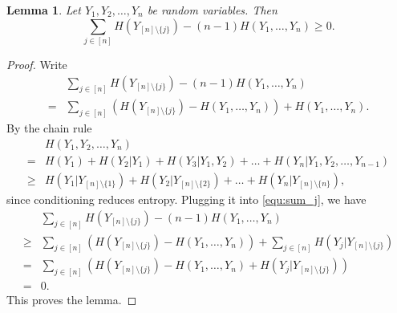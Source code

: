 \documentclass[11pt]{article}
\newtheorem{lemma}{Lemma}
\newcommand{\cond}{|}
\begin{document}
\begin{lemma}
\label{lem:sum_nm1_nonnegative}
Let $Y_1, Y_2, \ldots, Y_n$ be random variables. Then
\[
\sum_{j \in [n]} H(Y_{[n] \setminus \{j\}}) - (n-1) H(Y_1, \ldots, Y_n) \ge 0. 
\]
\end{lemma}
\begin{proof} Write
\begin{align}
 & \sum_{j \in [n]} H(Y_{[n] \setminus \{j\}}) - (n-1) H(Y_1, \ldots, Y_n) \nonumber\\
 = & \sum_{j \in [n]} \left(H(Y_{[n] \setminus \{j\}}) - H(Y_1, \ldots, Y_n) \right) + H(Y_1, \ldots, Y_n). \label{equ:sum_j}
\end{align}
By the chain rule
\begin{align*}
 & H(Y_1, Y_2, \ldots, Y_n) \\
 = & H(Y_1) + H(Y_2 \cond Y_1) + H(Y_3 \cond Y_1, Y_2) + \ldots + H(Y_n \cond Y_1, Y_2, \ldots, Y_{n-1}) \\
 \ge & H(Y_1 \cond Y_{[n] \setminus \{1\}}) + H(Y_2 \cond Y_{[n] \setminus \{2\}}) + \ldots + H(Y_n \cond Y_{[n] \setminus \{n\}}),
\end{align*}
since conditioning reduces entropy.
Plugging it into \eqref{equ:sum_j}, we have
\begin{align*}
 & \sum_{j \in [n]} H(Y_{[n] \setminus \{j\}}) - (n-1) H(Y_1, \ldots, Y_n)\\
 \ge & \sum_{j \in [n]} \left(H(Y_{[n] \setminus \{j\}}) - H(Y_1, \ldots, Y_n) \right) + \sum_{j \in [n]} H(Y_j \cond Y_{[n] \setminus \{j\}}) \\
 = & \sum_{j \in [n]} \left(H(Y_{[n] \setminus \{j\}}) - H(Y_1, \ldots, Y_n) + H(Y_j \cond Y_{[n] \setminus \{j\}})\right) \\
 = & 0.
\end{align*}
This proves the lemma.
\end{proof}
 
\end{document}
